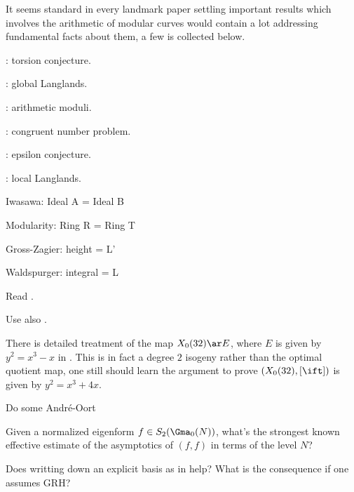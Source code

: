 \documentclass[a4paper, twoside]{article}
\begin{document}
\confighead{}{}{}

It seems standard in every landmark paper settling important results which involves the arithmetic of modular curves would contain a lot addressing fundamental facts about them, a few is collected below.
\begin{itm}
	\item \cite{Mazur1977Eisenstein}: torsion conjecture.
	\item \cite{Deligne1971Formes,DS1974,Scholze2015}: global Langlands.
	\item \cite{DR1973,KM1985,Conrad2007}: arithmetic moduli.
	\item \cite{Tian2014,TYZ2017,BT2020Horizontal}: congruent number problem.
	\item \cite{Ribet1990}: epsilon conjecture.
	\item \cite{Scholze2011,Scholze2013LLC,Lurie2023}: local Langlands.
\end{itm}

\begin{cmt}
\begin{itm}
	\item Iwasawa: Ideal A = Ideal B
	\item Modularity: Ring R = Ring T
	\item Gross-Zagier: height = L'
	\item Waldspurger: integral = L
\end{itm}
\end{cmt}




Read \cite{CW1977,Gross1984,GZ1986,Kolyvagin1990}.

Use also \cite{CW2008}.

\begin{rmk}
	There is detailed treatment of the map $X_{0}(32)\ar E$, where $E$ is given by $y^{2}=x^{3}-x$ in \cite{Tian2014,TYZ2017}. This is in fact a degree $2$ isogeny rather than the optimal quotient map, one still should learn the argument to prove $(X_{0}(32),[\ift])$ is given by $y^{2}=x^{3}+4x$.
\end{rmk}



 Do some Andr{\'e}-Oort

\begin{qst}
	Given a normalized eigenform $f\in S_{2}(\Gma_{0}(N))$, what's the strongest known effective estimate of the asymptotics of $(f,f)$ in terms of the level $N$?

	Does writting down an explicit basis as in \cite{HPS1989Basis} help? What is the consequence if one assumes GRH?
\end{qst}
\end{document}
